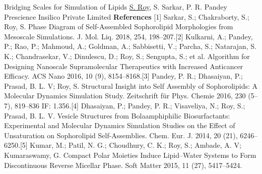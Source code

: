 \begin{abstract_online}{Bridging Scales for Simulation of Lipids}{%
        \underline{S. Roy}, S. Sarkar, P. R. Pandey}{%
        \IStag}{%
        Prescience Insilico Private Limited}
        \textbf{References} \newline{}[1] Sarkar, S.; Chakraborty, S.; Roy, S. Phase Diagram of Self-Assembled Sophorolipid Morphologies from Mesoscale Simulations. J. Mol. Liq. 2018, 254, 198–207.\newline{}[2] Kulkarni, A.; Pandey, P.; Rao, P.; Mahmoud, A.; Goldman, A.; Sabbisetti, V.; Parcha, S.; Natarajan, S. K.; Chandrasekar, V.; Dinulescu, D.; Roy, S.; Sengupta, S.; et al. Algorithm for Designing Nanoscale Supramolecular Therapeutics with Increased Anticancer Efficacy. ACS Nano 2016, 10 (9), 8154–8168.\newline{}[3] Pandey, P. R.; Dhasaiyan, P.; Prasad, B. L. V; Roy, S. Structural Insight into Self Assembly of Sophorolipids: A Molecular Dynamics Simulation Study. Zeitschrift für Phys. Chemie 2016, 230 (5–7), 819–836 IF: 1.356.\newline{}[4] Dhasaiyan, P.; Pandey, P. R.; Visaveliya, N.; Roy, S.; Prasad, B. L. V. Vesicle Structures from Bolaamphiphilic Biosurfactants: Experimental and Molecular Dynamics Simulation Studies on the Effect of Unsaturation on Sophorolipid Self-Assemblies. Chem. Eur. J. 2014, 20 (21), 6246–6250.\newline{}[5] Kumar, M.; Patil, N. G.; Choudhury, C. K.; Roy, S.; Ambade, A. V; Kumaraswamy, G. Compact Polar Moieties Induce Lipid--Water Systems to Form Discontinuous Reverse Micellar Phase. Soft Matter 2015, 11 (27), 5417–5424.
    \end{abstract_online}
    